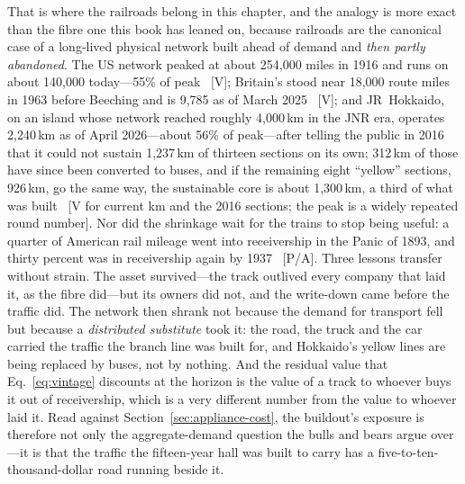 That is where the railroads belong in this chapter, and the analogy is more exact than the fibre one this book has leaned on, because railroads are the canonical case of a long-lived physical network built ahead of demand and \emph{then partly abandoned}. The US network peaked at about 254,000 miles in 1916 and runs on about 140,000 today---55\% of peak~\cite{rail-us} [V]; Britain's stood near 18,000 route miles in 1963 before Beeching and is 9,785 as of March 2025~\cite{rail-uk} [V]; and JR~Hokkaido, on an island whose network reached roughly 4,000\,km in the JNR era, operates 2,240\,km as of April 2026---about 56\% of peak---after telling the public in 2016 that it could not sustain 1,237\,km of thirteen sections on its own; 312\,km of those have since been converted to buses, and if the remaining eight ``yellow'' sections, 926\,km, go the same way, the sustainable core is about 1,300\,km, a third of what was built~\cite{jr-hokkaido} [V for current km and the 2016 sections; the peak is a widely repeated round number]. Nor did the shrinkage wait for the trains to stop being useful: a quarter of American rail mileage went into receivership in the Panic of 1893, and thirty percent was in receivership again by 1937~\cite{rail-us,rail-1893} [P/A]. Three lessons transfer without strain. The asset survived---the track outlived every company that laid it, as the fibre did---but its owners did not, and the write-down came before the traffic did. The network then shrank not because the demand for transport fell but because a \emph{distributed substitute} took it: the road, the truck and the car carried the traffic the branch line was built for, and Hokkaido's yellow lines are being replaced by buses, not by nothing. And the residual value that Eq.~\eqref{eq:vintage} discounts at the horizon is the value of a track to whoever buys it out of receivership, which is a very different number from the value to whoever laid it. Read against Section~\ref{sec:appliance-cost}, the buildout's exposure is therefore not only the aggregate-demand question the bulls and bears argue over---it is that the traffic the fifteen-year hall was built to carry has a five-to-ten-thousand-dollar road running beside it.

